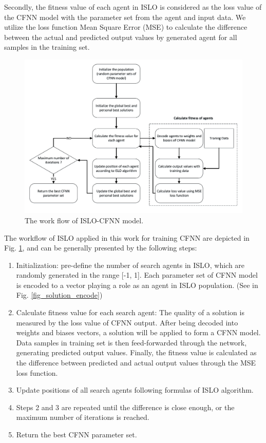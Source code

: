 \documentclass[a4paper,13pt,2p]{report}
\begin{document}
	Secondly, the fitness value of each agent in ISLO is considered as the loss value of the CFNN model with the parameter set from the agent and input data. We utilize the loss function Mean Square Error (MSE) to calculate the difference between the actual and predicted output values by generated agent for all samples in the training set. 
\begin{figure}[!ht] 
   \centering
   \includegraphics[width=1.0\linewidth]{pdf/model/islo_cfnn_workflow}
  \caption{The work flow of ISLO-CFNN model.} 
  \label{fig_islo_cfnn_workflow} 
\end{figure}	

	The workflow of ISLO applied in this work for training CFNN are depicted in Fig. \ref{fig_islo_cfnn_workflow}, and can be generally presented by the following steps:
	
\begin{enumerate}
\item Initialization: pre-define the number of search agents in ISLO, which are randomly generated in the range [-1, 1]. Each parameter set of CFNN model is encoded to a vector playing a role as an agent in ISLO population. (See in Fig. \ref{fig_solution_encode})
\item Calculate fitness value for each search agent: The quality of a solution is measured by the loss value of CFNN output. After being decoded into weights and biases vectors, a solution will be applied to form a CFNN model. Data samples in training set is then feed-forwarded through the network, generating predicted output values. Finally, the fitness value is calculated as the difference between predicted and actual output values through the MSE loss function.
\item Update positions of all search agents following formulas of ISLO algorithm.
\item Steps 2 and 3 are repeated until the difference is close enough, or the maximum number of iterations is reached.
\item Return the best CFNN parameter set. 
\end{enumerate}
	     
\end{document}
